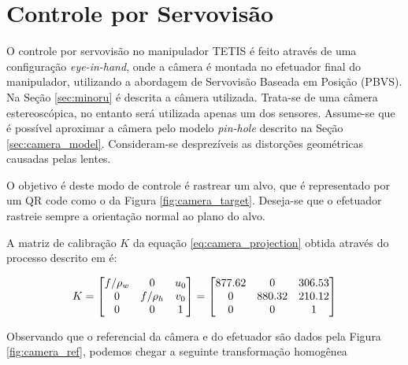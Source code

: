 \section{Controle por Servovisão} \label{sec:servo_vision}
O controle por servovisão no manipulador TETIS é feito através de uma configuração \textit{eye-in-hand}, onde a câmera é montada no efetuador final do manipulador, utilizando a abordagem de Servovisão Baseada em Posição (PBVS). Na Seção \ref{sec:minoru} é descrita a câmera utilizada. Trata-se de uma câmera estereoscópica, no entanto será utilizada apenas um dos sensores. Assume-se que é possível aproximar a câmera pelo modelo \textit{pin-hole} descrito na Seção \ref{sec:camera_model}. Consideram-se desprezíveis as distorções geométricas causadas pelas lentes.



O objetivo é deste modo de controle é rastrear um alvo, que é representado por um QR code como o da Figura \ref{fig:camera_target}. Deseja-se que o efetuador rastreie sempre a orientação normal ao plano do alvo.

A matriz de calibração ${K}$ da equação \eqref{eq:camera_projection} obtida através do processo descrito em \citep{visp_camera_calibration} é:

\begin{equation}
{K} = \begin{bmatrix}
	f/\rho_w & 0 & u_0 \\
	0        & f/\rho_h &v_0 \\
	0 & 0 & 1 \\
\end{bmatrix}
=
\begin{bmatrix}
	877.62 	& 0 		& 306.53 \\
	0  		& 880.32 	& 210.12 \\
	0   	& 0 		& 1 \\	
\end{bmatrix}	
\end{equation}

Observando que o referencial da câmera e do efetuador são dados pela Figura \ref{fig:camera_ref}, podemos chegar a seguinte transformação homogênea

